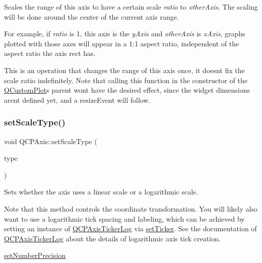 Scales the range of this axis to have a certain scale {\itshape ratio} to {\itshape other\+Axis}. The scaling will be done around the center of the current axis range.

For example, if {\itshape ratio} is 1, this axis is the {\itshape y\+Axis} and {\itshape other\+Axis} is {\itshape x\+Axis}, graphs plotted with those axes will appear in a 1\+:1 aspect ratio, independent of the aspect ratio the axis rect has.

This is an operation that changes the range of this axis once, it doesn\textquotesingle{}t fix the scale ratio indefinitely. Note that calling this function in the constructor of the \hyperlink{class_q_custom_plot}{Q\+Custom\+Plot}\textquotesingle{}s parent won\textquotesingle{}t have the desired effect, since the widget dimensions aren\textquotesingle{}t defined yet, and a resize\+Event will follow. \mbox{\label{class_q_c_p_axis_adef29cae617af4f519f6c40d1a866ca6}} 
\subsubsection{\texorpdfstring{set\+Scale\+Type()}{setScaleType()}}
{\footnotesize\ttfamily void Q\+C\+P\+Axis\+::set\+Scale\+Type (\begin{DoxyParamCaption}\item[{\hyperlink{class_q_c_p_axis_a36d8e8658dbaa179bf2aeb973db2d6f0}{Q\+C\+P\+Axis\+::\+Scale\+Type}}]{type }\end{DoxyParamCaption})}

Sets whether the axis uses a linear scale or a logarithmic scale.

Note that this method controls the coordinate transformation. You will likely also want to use a logarithmic tick spacing and labeling, which can be achieved by setting an instance of \hyperlink{class_q_c_p_axis_ticker_log}{Q\+C\+P\+Axis\+Ticker\+Log} via \hyperlink{class_q_c_p_axis_a4ee03fcd2c74d05cd1a419b9af5cfbdc}{set\+Ticker}. See the documentation of \hyperlink{class_q_c_p_axis_ticker_log}{Q\+C\+P\+Axis\+Ticker\+Log} about the details of logarithmic axis tick creation.

\hyperlink{class_q_c_p_axis_a21dc8023ad7500382ad9574b48137e63}{set\+Number\+Precision} \mbox{\label{class_q_c_p_axis_aeb917a909215605b95ef2be843de1ee8}} 
